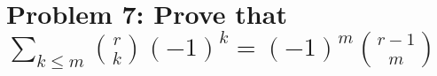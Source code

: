 ﻿\section{Problem 7: Prove that $\sum_{k\leq m} \binom{r}{k} (-1)^k = (-1)^m \binom{r-1}{m}$}
\label{sec:problem-7}











\clearpage
